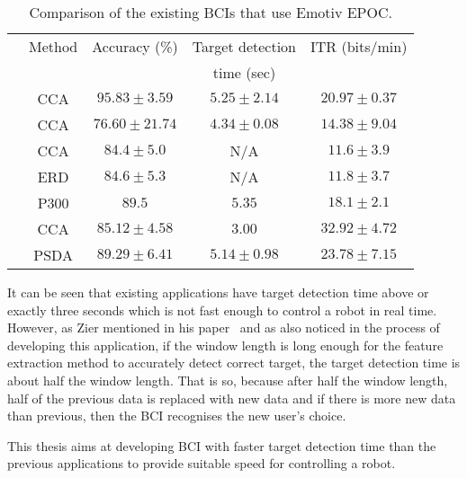 \begin{table}[h]
	\centering
	\begin{tabular}{|c|c|c|c|c|}\hline
		& Method& Accuracy (\%)		& Target detection 	& ITR (bits/min)	\\
		&		&					& time (sec)		&					\\\hline
\liu	& CCA	& $95.83\pm 3.59$	& $5.25\pm 2.14$	& $20.97\pm 0.37$	\\\hline
\lin	& CCA	& $76.60\pm 21.74$	& $4.34\pm 0.08$	& $14.38\pm 9.04$	\\\hline
		& CCA	& $84.4\pm 5.0$		& N/A				& $11.6\pm 3.9$		\\\cline{2-5}
\choi	& ERD	& $84.6\pm 5.3$		& N/A				& $11.8\pm 3.7$		\\\cline{2-5}
		& P300	& $89.5$			& $5.35$			& $18.1\pm 2.1$		\\\hline
\hvar	& CCA	& $85.12\pm 4.58$	& $3.00$			& $32.92\pm 4.72$	\\\cline{2-5}
\moe	& PSDA	& $89.29\pm 6.41$	& $5.14\pm 0.98$	& $23.78\pm 7.15$	\\\hline
	\end{tabular}
	\caption{Comparison of the existing BCIs that use Emotiv EPOC.}
	\label{tab:emotiv_BCIs}
\end{table}

It can be seen that existing applications have \gls{target} detection time above or exactly three seconds which is not fast enough to control a robot in real time. However, as Zier mentioned in his paper~\cite{emotiv_psda} and as also noticed in the process of developing this application, if the \gls{window} length is long enough for the \gls{feature extraction} method to accurately detect correct \gls{target}, the \gls{target} detection time is about half the \gls{window} length. That is so, because after half the \gls{window} length, half of the previous data is replaced with new data and if there is more new data than previous, then the \gls{BCI} recognises the new user's choice.

This thesis aims at developing \gls{BCI} with faster \gls{target} detection time than the previous applications to provide suitable speed for controlling a robot.
